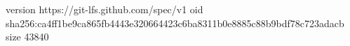 version https://git-lfs.github.com/spec/v1
oid sha256:ca4ff1be9ca865fb4443e320664423c6ba8311b0e8885c88b9bdf78c723adacb
size 43840
